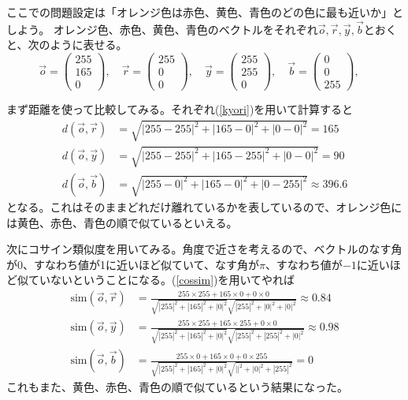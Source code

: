 \documentclass[10pt]{jsreport}
\theoremstyle{definition}%
\numberwithin{equation}{section}%
\begin{document}
ここでの問題設定は「オレンジ色は赤色、黄色、青色のどの色に最も近いか」としよう。
オレンジ色、赤色、黄色、青色のベクトルをそれぞれ$\vec{o},\vec{r},\vec{y},\vec{b}$とおくと、次のように表せる。
\begin{equation}
  \vec{o}=\left( \begin{matrix}
    255\\
    165\\
    0
  \end{matrix}\right),\quad 
  \vec{r}=\left( \begin{matrix}
    255\\
    0\\
    0
  \end{matrix}\right),\quad 
  \vec{y}=\left( \begin{matrix}
    255\\
    255\\
    0
  \end{matrix}\right),\quad 
  \vec{b}=\left( \begin{matrix}
    0\\
    0\\
    255
  \end{matrix}\right),\quad 
\end{equation}


まず距離を使って比較してみる。それぞれ(\ref{kyori})を用いて計算すると
\begin{align}
  d(\vec{o},\vec{r})&=\sqrt{|255-255|^{2}+|165-0|^{2}+|0-0|^{2}}=165\\
  d(\vec{o},\vec{y})&=\sqrt{|255-255|^{2}+|165-255|^{2}+|0-0|^{2}}=90\\
  d(\vec{o},\vec{b})&=\sqrt{|255-0|^{2}+|165-0|^{2}+|0-255|^{2}}\approx 396.6
\end{align}
となる。これはそのままどれだけ離れているかを表しているので、オレンジ色には黄色、赤色、青色の順で似ているといえる。


次にコサイン類似度を用いてみる。角度で近さを考えるので、ベクトルのなす角が0、すなわち値が1に近いほど似ていて、なす角が$\pi$、すなわち値が$-1$に近いほど似ていないということになる。(\ref{cossim})を用いてやれば
\begin{align}
  \mathrm{sim}(\vec{o},\vec{r})&=\frac{255\times 255 +165\times 0 +0\times0}{\sqrt{|255|^{2}+|165|^{2}+|0|^2}\sqrt{|255|^{2}+|0|^{2}+|0|^2}}\approx 0.84\\
  \mathrm{sim}(\vec{o},\vec{y})&=\frac{255\times 255 +165\times 255 +0\times0}{\sqrt{|255|^{2}+|165|^{2}+|0|^2}\sqrt{|255|^{2}+|255|^{2}+|0|^2}}\approx 0.98\\
  \mathrm{sim}(\vec{o},\vec{b})&=\frac{255\times 0 +165\times 0 +0\times255}{\sqrt{|255|^{2}+|165|^{2}+|0|^2}\sqrt{||^{2}+|0|^{2}+|255|^2}}= 0
\end{align}
これもまた、黄色、赤色、青色の順で似ているという結果になった。
\end{document}
